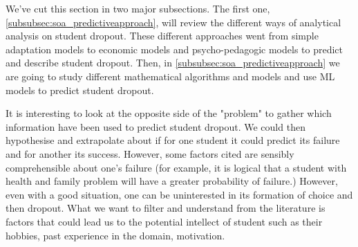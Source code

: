 \documentclass[../../main.tex]{subfiles}
\begin{document}
We've cut this section in two major subsections. The first one, \ref{subsubsec:soa_predictiveapproach}, will review the different ways of analytical analysis on student dropout. These different approaches went from simple adaptation models to economic models and psycho-pedagogic models to predict and describe student dropout. Then, in \ref{subsubsec:soa_predictiveapproach} we are going to study different mathematical algorithms and models and use ML models to predict student dropout.

It is interesting to look at the opposite side of the "problem" to gather which information have been used to predict student dropout. We could then hypothesise and extrapolate about if for one student it could predict its failure and for another its success.
However, some factors cited are sensibly comprehensible about one's failure (for example, it is logical that a student with health and family problem will have a greater probability of failure.) However, even with a good situation, one can be uninterested in its formation of choice and then dropout. 
What we want to filter and understand from the literature is factors that could lead us to the potential intellect of student such as their hobbies, past experience in the domain, motivation.
\end{document}
